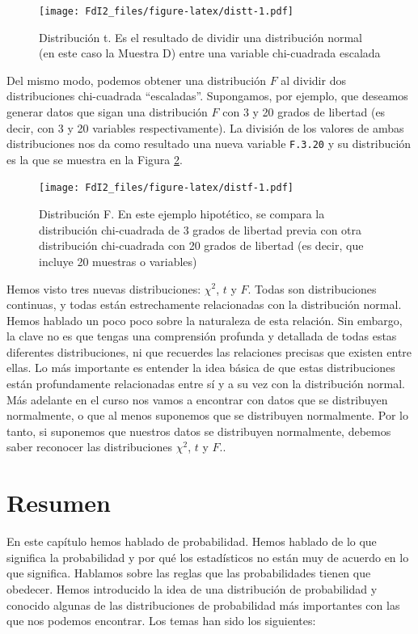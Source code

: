 \documentclass[spanish,]{book}
\begin{document}
\begin{figure}
\centering
\texttt{[image: FdI2\_files/figure-latex/distt-1.pdf]}
\caption{\label{fig:distt}Distribución t. Es el resultado de dividir una
distribución normal (en este caso la Muestra D) entre una variable
chi-cuadrada escalada}
\end{figure}

Del mismo modo, podemos obtener una distribución \(F\) al dividir dos
distribuciones chi-cuadrada ``escaladas''. Supongamos, por ejemplo, que
deseamos generar datos que sigan una distribución \(F\) con 3 y 20
grados de libertad (es decir, con 3 y 20 variables respectivamente). La
división de los valores de ambas distribuciones nos da como resultado
una nueva variable \texttt{F.3.20} y su distribución es la que se
muestra en la Figura \ref{fig:distf}.

\begin{figure}
\centering
\texttt{[image: FdI2\_files/figure-latex/distf-1.pdf]}
\caption{\label{fig:distf}Distribución F. En este ejemplo hipotético, se
compara la distribución chi-cuadrada de 3 grados de libertad previa con
otra distribución chi-cuadrada con 20 grados de libertad (es decir, que
incluye 20 muestras o variables)}
\end{figure}

Hemos visto tres nuevas distribuciones: \(\chi^2\), \(t\) y \(F\). Todas
son distribuciones continuas, y todas están estrechamente relacionadas
con la distribución normal. Hemos hablado un poco poco sobre la
naturaleza de esta relación. Sin embargo, la clave no es que tengas una
comprensión profunda y detallada de todas estas diferentes
distribuciones, ni que recuerdes las relaciones precisas que existen
entre ellas. Lo más importante es entender la idea básica de que estas
distribuciones están profundamente relacionadas entre sí y a su vez con
la distribución normal. Más adelante en el curso nos vamos a encontrar
con datos que se distribuyen normalmente, o que al menos suponemos que
se distribuyen normalmente. Por lo tanto, si suponemos que nuestros
datos se distribuyen normalmente, debemos saber reconocer las
distribuciones \(\chi^2\), \(t\) y \(F\)..

\section{Resumen}\label{resumen}

En este capítulo hemos hablado de probabilidad. Hemos hablado de lo que
significa la probabilidad y por qué los estadísticos no están muy de
acuerdo en lo que significa. Hablamos sobre las reglas que las
probabilidades tienen que obedecer. Hemos introducido la idea de una
distribución de probabilidad y conocido algunas de las distribuciones de
probabilidad más importantes con las que nos podemos encontrar. Los
temas han sido los siguientes:
\end{document}
